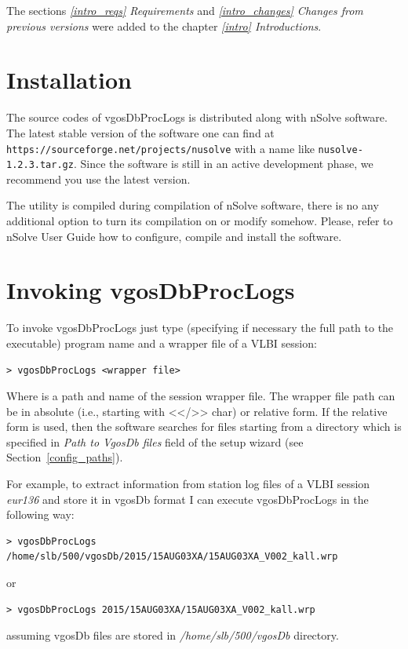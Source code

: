 \documentclass [10pt,letterpaper]{report}
\newcommand{\nuSolve}{\greektext n\latintext Solve}
\begin{document}
The sections \emph{\ref{intro_reqs} Requirements} and
\emph{\ref{intro_changes} Changes from previous versions} were added to
the chapter \emph{\ref{intro} Introductions}.






%
%
\chapter{Installation}

The source codes of vgosDbProcLogs is distributed along with \nuSolve{}
software. The latest stable version of the software one can find at
{\tt https://sourceforge.net/projects/nusolve} with a name like
{\tt nusolve-1.2.3.tar.gz}. Since the software is still in an active
development phase, we recommend you use the latest version.

The utility is compiled during compilation of \nuSolve{} software, there
is no any additional option to turn its compilation on or modify
somehow. Please, refer to \nuSolve{} User Guide how to configure,
compile and install the software.


%
%
\chapter{Invoking vgosDbProcLogs}

%
%
%
%
%
%
%
%
%



\label{chapter_invokation}
To invoke vgosDbProcLogs just type (specifying if necessary the full path
to the executable) program name and a wrapper file of a VLBI session:
\begin{verbatim}
> vgosDbProcLogs <wrapper file>
\end{verbatim}
\noindent
Where {\sl <wrapper file>} is a path and name of the session wrapper file.
The wrapper file path can be in absolute (i.e., starting with <</>> char)
or relative form. If the relative form is used, then the software searches
for files starting from a directory which is specified in
{\sl Path to VgosDb files} field of the setup wizard (see Section~\ref{config_paths}).

For example, to extract information from station log files of a VLBI session
{\sl eur136} and store it in vgosDb format I can execute vgosDbProcLogs in
the following way:
\begin{verbatim}
> vgosDbProcLogs /home/slb/500/vgosDb/2015/15AUG03XA/15AUG03XA_V002_kall.wrp
\end{verbatim}
\noindent
or
\begin{verbatim}
> vgosDbProcLogs 2015/15AUG03XA/15AUG03XA_V002_kall.wrp
\end{verbatim}
\noindent
assuming vgosDb files are stored in {\sl /home/slb/500/vgosDb} directory.
\end{document}
